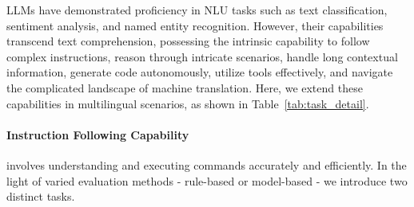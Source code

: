 LLMs have demonstrated proficiency in NLU tasks such as text classification, sentiment analysis, and named entity recognition. However, their capabilities transcend text comprehension, possessing the intrinsic capability to follow complex instructions, reason through intricate scenarios, handle long contextual information, generate code autonomously, utilize tools effectively, and navigate the complicated landscape of machine translation. Here, we extend these capabilities in multilingual scenarios, as shown in Table~\ref{tab:task_detail}.

\begingroup
\renewcommand{\arraystretch}{1.4} %
\begin{table*}[!ht]
    \centering
    \caption{Tasks Details.}
    \label{tab:task_detail}
\end{table*}
\endgroup

\paragraph{Instruction Following Capability} involves understanding and executing commands accurately and efficiently. In the light of varied evaluation methods - rule-based or model-based - we introduce two distinct tasks.


